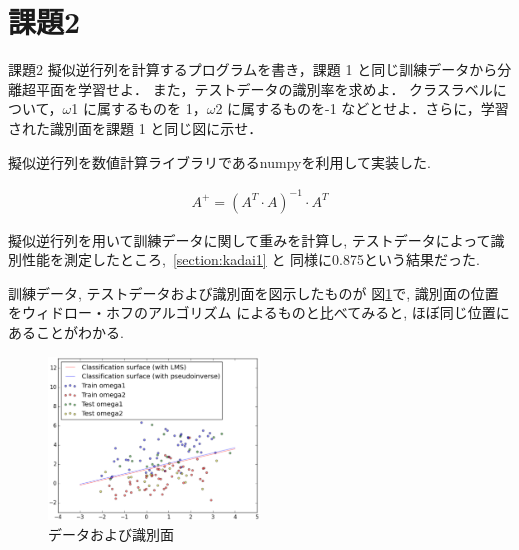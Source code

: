 \documentclass[10pt,a4paper,twocolumn]{jarticle}
\begin{document}
\section{課題2}\label{section:kadai2}
\begin{itembox}{課題2}
  擬似逆行列を計算するプログラムを書き，課題 1 と同じ訓練データから分離超平面を学習せよ．
  また，テストデータの識別率を求めよ．
  クラスラベルについて，$\omega$1 に属するものを 1，$\omega$2 に属するものを-1 などとせよ．さらに，学習された識別面を課題 1 と同じ図に示せ．
\end{itembox}

擬似逆行列を数値計算ライブラリであるnumpyを利用して実装した. 

\begin{eqnarray*}
  A^{+} = (A^{T} \cdot A)^{-1} \cdot A^{T}
\end{eqnarray*}

擬似逆行列を用いて訓練データに関して重みを計算し, 
テストデータによって識別性能を測定したところ,~\ref{section:kadai1} と
同様に0.875という結果だった. 

訓練データ, テストデータおよび識別面を図示したものが
図\ref{fig:kadai2}で, 識別面の位置をウィドロー・ホフのアルゴリズム
によるものと比べてみると, ほぼ同じ位置にあることがわかる. 

\begin{figure}[htbp]
  \centering
  \includegraphics[width=0.5\textwidth]{./assets/kadai2_plot_20150122_031556.eps}
  \caption{データおよび識別面}
  \label{fig:kadai2}
\end{figure}

\end{document}
